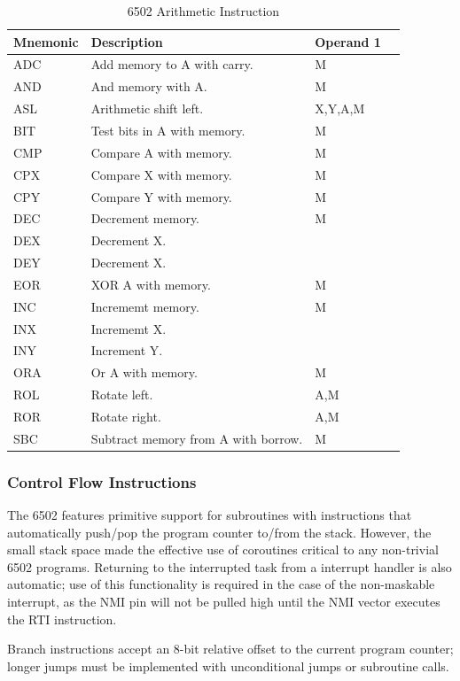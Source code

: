 \documentclass[journal]{IEEEtran}
\begin{document}
\begin{table}
\centering
\begin{tabular}[H!]{|l|l|l|l|}
\hline
\textbf{Mnemonic} & \textbf{Description} & \textbf{Operand 1} \\
\hline
ADC & Add memory to A with carry. & M \\
AND & And memory with A. & M \\
ASL & Arithmetic shift left. & X,Y,A,M \\
BIT & Test bits in A with memory. & M \\
CMP & Compare A with memory. & M \\
CPX & Compare X with memory. & M \\
CPY & Compare Y with memory. & M \\
DEC & Decrement memory. & M \\
DEX & Decrement X. & \\
DEY & Decrement X. & \\
EOR & XOR A with memory. & M \\
INC & Incrememt memory. & M \\
INX & Incrememt X. & \\
INY & Increment Y. & \\
ORA & Or A with memory. & M \\
ROL & Rotate left. & A,M \\
ROR & Rotate right. & A,M \\
SBC & Subtract memory from A with borrow. & M \\
\hline
\end{tabular}
\caption{6502 Arithmetic Instruction}
\label{arith}
\end{table}

\subsubsection{Control Flow Instructions}

The 6502 features primitive support for subroutines with instructions that
automatically push/pop the program counter to/from the stack. However, the small
stack space made the effective use of coroutines critical to any non-trivial
6502 programs. Returning to the interrupted task from a interrupt handler is
also automatic; use of this functionality is required in the case of the
non-maskable interrupt, as the NMI pin will not be pulled high until the NMI
vector executes the RTI instruction.

Branch instructions accept an 8-bit relative offset to the current program
counter; longer jumps must be implemented with unconditional jumps or subroutine
calls.
\end{document}
